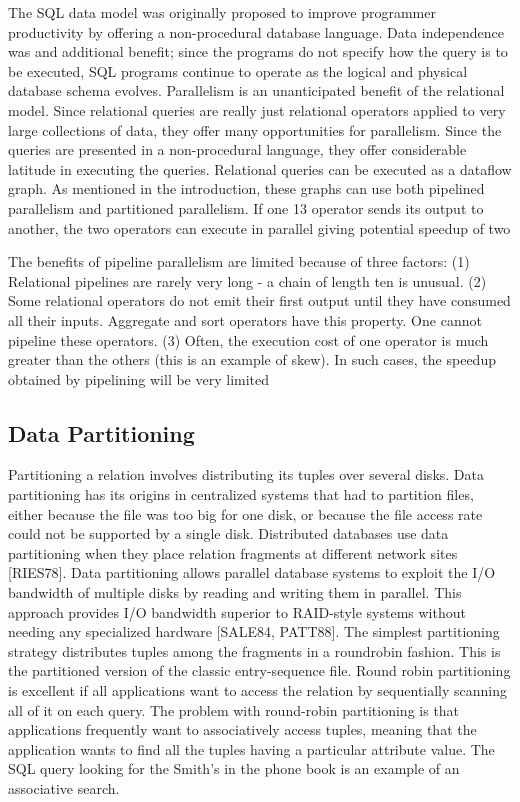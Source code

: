 \documentclass[10pt,twocolumn]{IEEEtran11}
\begin{document}
The SQL data model was originally proposed to improve programmer productivity by
offering a non-procedural database language. Data independence was and additional benefit;
since the programs do not specify how the query is to be executed, SQL programs continue to
operate as the logical and physical database schema evolves.
Parallelism is an unanticipated benefit of the relational model. Since relational queries
are really just relational operators applied to very large collections of data, they offer many
opportunities for parallelism. Since the queries are presented in a non-procedural language, they
offer considerable latitude in executing the queries.
Relational queries can be executed as a dataflow graph. As mentioned in the
introduction, these graphs can use both pipelined parallelism and partitioned parallelism. If one
13
operator sends its output to another, the two operators can execute in parallel giving potential
speedup of two

The benefits of pipeline parallelism are limited because of three factors: (1) Relational
pipelines are rarely very long - a chain of length ten is unusual. (2) Some relational operators do
not emit their first output until they have consumed all their inputs. Aggregate and sort operators
have this property. One cannot pipeline these operators. (3) Often, the execution cost of one
operator is much greater than the others (this is an example of skew). In such cases, the speedup
obtained by pipelining will be very limited

\subsection{Data Partitioning}

Partitioning a relation involves distributing its tuples over several disks. Data partitioning
has its origins in centralized systems that had to partition files, either because the file was too big
for one disk, or because the file access rate could not be supported by a single disk. Distributed
databases use data partitioning when they place relation fragments at different network sites
[RIES78]. Data partitioning allows parallel database systems to exploit the I/O bandwidth of
multiple disks by reading and writing them in parallel. This approach provides I/O bandwidth
superior to RAID-style systems without needing any specialized hardware [SALE84, PATT88].
The simplest partitioning strategy distributes tuples among the fragments in a roundrobin
fashion. This is the partitioned version of the classic entry-sequence file. Round robin
partitioning is excellent if all applications want to access the relation by sequentially scanning all
of it on each query. The problem with round-robin partitioning is that applications frequently
want to associatively access tuples, meaning that the application wants to find all the tuples
having a particular attribute value. The SQL query looking for the Smith's in the phone book is
an example of an associative search.
\end{document}
